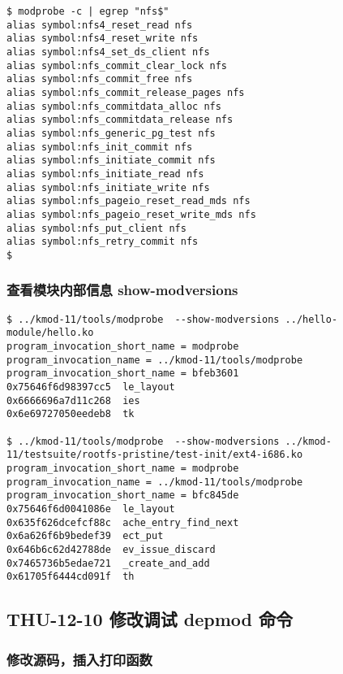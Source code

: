 \documentclass[11pt,a4paper]{article}
\begin{document}
{\begin{shaded}\begin{verbatim}
$ modprobe -c | egrep "nfs$"
alias symbol:nfs4_reset_read nfs
alias symbol:nfs4_reset_write nfs
alias symbol:nfs4_set_ds_client nfs
alias symbol:nfs_commit_clear_lock nfs
alias symbol:nfs_commit_free nfs
alias symbol:nfs_commit_release_pages nfs
alias symbol:nfs_commitdata_alloc nfs
alias symbol:nfs_commitdata_release nfs
alias symbol:nfs_generic_pg_test nfs
alias symbol:nfs_init_commit nfs
alias symbol:nfs_initiate_commit nfs
alias symbol:nfs_initiate_read nfs
alias symbol:nfs_initiate_write nfs
alias symbol:nfs_pageio_reset_read_mds nfs
alias symbol:nfs_pageio_reset_write_mds nfs
alias symbol:nfs_put_client nfs
alias symbol:nfs_retry_commit nfs
$ 
\end{verbatim}\end{shaded}}
\subsubsection{查看模块内部信息 show-modversions}

{\begin{shaded}\begin{verbatim}
$ ../kmod-11/tools/modprobe  --show-modversions ../hello-module/hello.ko 
program_invocation_short_name = modprobe
program_invocation_name = ../kmod-11/tools/modprobe
program_invocation_short_name = bfeb3601
0x75646f6d98397cc5  le_layout
0x6666696a7d11c268  ies
0x6e69727050eedeb8  tk

$ ../kmod-11/tools/modprobe  --show-modversions ../kmod-11/testsuite/rootfs-pristine/test-init/ext4-i686.ko 
program_invocation_short_name = modprobe
program_invocation_name = ../kmod-11/tools/modprobe
program_invocation_short_name = bfc845de
0x75646f6d0041086e  le_layout
0x635f626dcefcf88c  ache_entry_find_next
0x6a626f6b9bedef39  ect_put
0x646b6c62d42788de  ev_issue_discard
0x7465736b5edae721  _create_and_add
0x61705f6444cd091f  th
\end{verbatim}\end{shaded}}
\subsection{THU-12-10 修改调试 depmod 命令}

\subsubsection{修改源码，插入打印函数}
\end{document}
